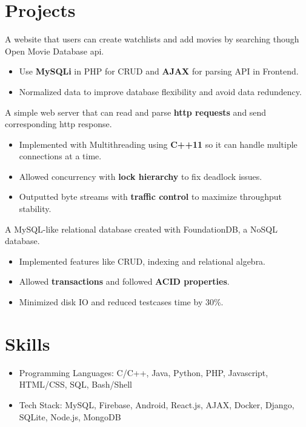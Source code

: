 \documentclass{resume}
\begin{document}
\section{Projects}
 {}
  A website that users can create watchlists and add movies by searching though Open Movie Database api.
\begin{itemize}
  \item Use \textbf{MySQLi} in PHP for CRUD and \textbf{AJAX} for parsing API in Frontend.
  \item Normalized data to improve database flexibility and avoid data redundency.
\end{itemize}

 {}
  A simple web server that can read and parse \textbf{http requests} and send corresponding http response.
\begin{itemize}
  \item Implemented with Multithreading using \textbf{C++11} so it can handle multiple connections at a time.
  \item Allowed concurrency with \textbf{lock hierarchy} to fix deadlock issues.
  \item Outputted byte streams with \textbf{traffic control} to maximize throughput stability.
\end{itemize}

 {}
  A MySQL-like relational database created with FoundationDB, a NoSQL database.
\begin{itemize}
  \item Implemented features like CRUD, indexing and relational algebra.
  \item Allowed \textbf{transactions} and followed \textbf{ACID properties}.
  \item Minimized disk IO and reduced testcases time by 30\%.
\end{itemize}

\section{Skills}
\begin{itemize}[parsep=0.5ex]
  \item Programming Languages: C/C++, Java, Python, PHP, Javascript, HTML/CSS, SQL, Bash/Shell
  \item Tech Stack: MySQL, Firebase, Android, React.js, AJAX, Docker, Django, SQLite, Node.js, MongoDB
\end{itemize}
\end{document}
